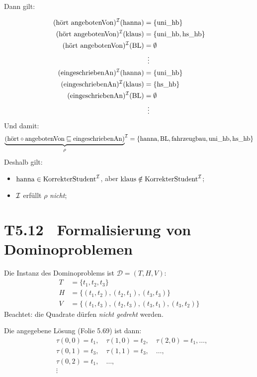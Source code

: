 \documentclass[fontsize=11pt, twoside=false, numbers=autoenddot]{scrbook}
\begin{document}
Dann gilt: 

\begin{align*}
  (\text{hört}\ \text{angebotenVon})^\mathcal{I}(\text{hanna}) &=
  \{\text{uni$\_$hb}\} \\
  (\text{hört}\ \text{angebotenVon})^\mathcal{I}(\text{klaus}) &=
  \{\text{uni$\_$hb},\text{hs$\_$hb}\} \\
  (\text{hört}\ \text{angebotenVon})^\mathcal{I}(\text{BL}) &= \emptyset \\
  & ~\vdots \\
  (\text{eingeschriebenAn})^\mathcal{I}(\text{hanna}) &=
  \{\text{uni$\_$hb}\} \\
  (\text{eingeschriebenAn})^\mathcal{I}(\text{klaus}) &=
  \{\text{hs$\_$hb}\} \\
  (\text{eingeschriebenAn})^\mathcal{I}(\text{BL}) &= \emptyset
  \\
  & ~\vdots
\end{align*}
%
Und damit:
%
\[{\underbrace{(\text{hört}\circ\text{angebotenVon}\sqsubseteq
  \text{eingeschriebenAn})}_{\rho}}^\mathcal{I} =
\{\text{hanna},\text{BL},\text{fahrzeugbau},\text{uni$\_$hb},\text{hs$\_$hb}\}\]
Deshalb gilt:
%
\begin{itemize}

  \item $\text{hanna}\in \text{KorrekterStudent}^\mathcal{I}$, aber
    $\text{klaus}\notin \text{KorrekterStudent}^\mathcal{I}$;

  \item $\mathcal{I}$ erfüllt $\rho$ \emph{nicht};


\end{itemize}


\section*{T5.12~ Formalisierung von Dominoproblemen}

Die Instanz des Dominoproblems ist $\mathcal{D} = (T,H,V)$: 
%
\begin{align*}
  T & =\{t_1,t_2,t_3\} \\
  H & = \{(t_1,t_2), (t_2,t_1), (t_3,t_3) \} \\
  V & = \{(t_1,t_3), (t_2,t_3), (t_3,t_1), (t_3,t_2) \}
\end{align*}
%
Beachtet: die Quadrate dürfen \emph{nicht gedreht} werden. 

Die angegebene Lösung (Folie 5.69) ist dann: 
%
\begin{align*}
  &\tau(0,0) = t_1, \quad\tau(1,0)=t_2, \quad\tau(2,0)=t_1,\ldots, \\
  &\tau(0,1) = t_3, \quad\tau(1,1)=t_3, \quad\ldots, \\
  &\tau(0,2) = t_1, \quad\ldots, \\
  & \vdots
\end{align*}
\end{document}

